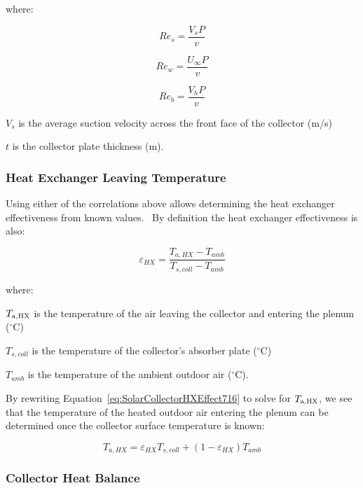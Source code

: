 where:

\begin{equation}
{Re_s} = \frac{{{V_s}P}}{v}
\end{equation}

\begin{equation}
{Re_w} = \frac{{{U_\infty }P}}{v}
\end{equation}

\begin{equation}
{Re_b} = \frac{{{V_h}P}}{v}
\end{equation}

\({V_s}\) is the average suction velocity across the front face of the collector (m/s)

\(t\) is the collector plate thickness (m).

\subsubsection{Heat Exchanger Leaving Temperature}\label{heat-exchanger-leaving-temperature}

Using either of the correlations above allows determining the heat exchanger effectiveness from known values.~ By definition the heat exchanger effectiveness is also:

\begin{equation}
{\varepsilon_{HX}} = \frac{{{T_{a,HX}} - {T_{amb}}}}{{{T_{s,coll}} - {T_{amb}}}}
\label{eq:SolarCollectorHXEffect716}
\end{equation}

where:

\({T_{{\rm{a,HX}}}}\) is the temperature of the air leaving the collector and entering the plenum (\(^{\circ}\)C)

\({T_{s,coll}}\) is the temperature of the collector's absorber plate (\(^{\circ}\)C)

\({T_{amb}}\) is the temperature of the ambient outdoor air (\(^{\circ}\)C).

By rewriting Equation~\ref{eq:SolarCollectorHXEffect716} to solve for \({T_{{\rm{a,HX}}}}\), we see that the temperature of the heated outdoor air entering the plenum can be determined once the collector surface temperature is known:

\begin{equation}
{T_{a,HX}} = {\varepsilon_{HX}}{T_{s,coll}} + \left( {1 - {\varepsilon_{HX}}} \right){T_{amb}}
\end{equation}

\subsubsection{Collector Heat Balance}\label{collector-heat-balance}

